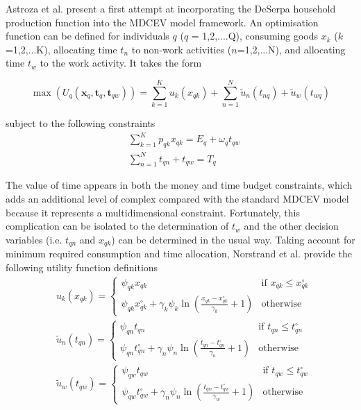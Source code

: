 Astroza et al. \cite{Astroza2017AConsumption} present a first attempt at incorporating the DeSerpa household production function into the MDCEV model framework. An optimisation function can be defined for individuals $q$ ($q$ = 1,2,....Q), consuming goods $x_k$ ($k$=1,2,...K), allocating time $t_n$ to non-work activities ($n$=1,2,...N), and allocating time $t_w$ to the work activity. It takes the form

\begin{equation}\label{eq:util1}
    \max(U_q(\bm{x}_q,\bm{t}_q,\bm{t}_{qw})) = \sum_{k=1}^K u_k(x_{qk}) + \sum_{n=1}^N\widetilde{u}_n(t_{nq}) + \widetilde{u}_w(t_{wq})
\end{equation}

subject to the following constraints
\begin{subequations}\label{eq:st}
    \begin{align}
        &\sum_{k=1}^K p_{qk}x_{qk} = E_q + \omega_q t_{qw} \\
        &\sum_{n=1}^N t_{qn} + t_{qw} = T_q
    \end{align}
\end{subequations}

The value of time appears in both the money and time budget constraints, which adds an additional level of complex compared with the standard MDCEV model because it represents a multidimensional constraint. Fortunately, this complication can be isolated to the determination of $t_w$ and the other decision variables (i.e. $t_{qn}$ and $x_{qk}$) can be determined in the usual way. Taking account for minimum required consumption and time allocation, Norstrand et al. \cite{VanNostrand2013AnalysisFramework} provide the following utility function definitions
\begin{subequations}\label{eq:util2}
\begin{align}
    &u_k(x_{qk}) = 
    \begin{cases}
    \psi_{qk}x_{qk} & \text{if } x_{qk} \leq x_{qk}^\circ \\
    \psi_{qk}x_{qk}^\circ + \gamma_k \psi_k \ln \left(\frac{x_{qk} - x_{qk}^\circ}{\gamma_k}+1\right) & \text{otherwise}
    \end{cases} \\
    &\widetilde{u}_n(t_{qn}) = 
    \begin{cases}
    \psi_{qn}t_{qn} & \text{if } t_{qn} \leq t_{qn}^\circ \\
    \psi_{qn}t_{qn}^\circ + \gamma_n \psi_n \ln \left(\frac{t_{qn} - t_{qn}^\circ}{\gamma_n}+1\right) & \text{otherwise}
    \end{cases} \\
    &\widetilde{u}_w(t_{qw}) = 
    \begin{cases}
    \psi_{qw}t_{qw} & \text{if } t_{qw} \leq t_{qw}^\circ \\
    \psi_{qw}t_{qw}^\circ + \gamma_n \psi_n \ln \left(\frac{t_{qw} - t_{qw}^\circ}{\gamma_w}+1\right) & \text{otherwise}
    \end{cases}
\end{align}
\end{subequations}

